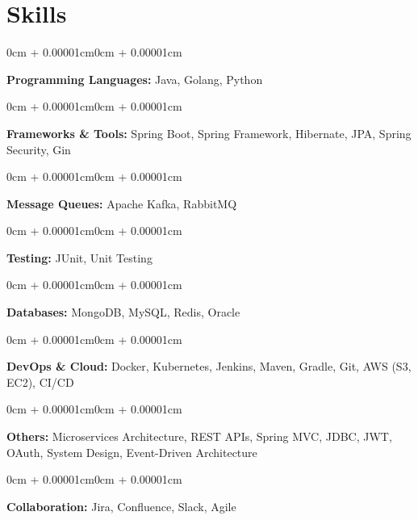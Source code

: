 \documentclass[11pt, letterpaper]{article}
\newenvironment{onecolentry}{
    \begin{adjustwidth}{0cm + 0.00001cm}{0cm + 0.00001cm}
}{
    \end{adjustwidth}
}
\begin{document}
    \section{Skills}

    \begin{onecolentry}
        \textbf{Programming Languages:} Java, Golang, Python
    \end{onecolentry}

    \vspace{0.1cm}

    \begin{onecolentry}
        \textbf{Frameworks \& Tools:} Spring Boot, Spring Framework, Hibernate, JPA, Spring Security, Gin
    \end{onecolentry}

    \vspace{0.1cm}

    \begin{onecolentry}
        \textbf{Message Queues:} Apache Kafka, RabbitMQ
    \end{onecolentry}

    \vspace{0.1cm}

    \begin{onecolentry}
        \textbf{Testing:} JUnit, Unit Testing
    \end{onecolentry}

    \vspace{0.1cm}

    \begin{onecolentry}
        \textbf{Databases:} MongoDB, MySQL, Redis, Oracle
    \end{onecolentry}

    \vspace{0.1cm}

    \begin{onecolentry}
        \textbf{DevOps \& Cloud:} Docker, Kubernetes, Jenkins, Maven, Gradle, Git, AWS (S3, EC2), CI/CD
    \end{onecolentry}

    \vspace{0.1cm}

    \begin{onecolentry}
        \textbf{Others:} Microservices Architecture, REST APIs, Spring MVC, JDBC, JWT, OAuth, System Design, Event-Driven Architecture
    \end{onecolentry}

    \vspace{0.1cm}

    \begin{onecolentry}
        \textbf{Collaboration:} Jira, Confluence, Slack, Agile
    \end{onecolentry}
\end{document}
